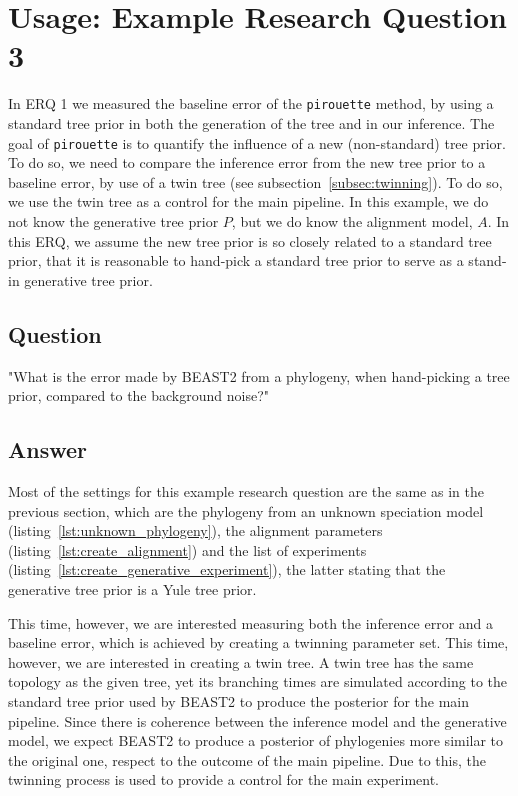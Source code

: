 \documentclass{article}
\begin{document}
\section{Usage: Example Research Question 3}

In ERQ 1 we measured the baseline error of the \verb;pirouette; method, 
by using a standard tree prior in both the generation of the tree 
and in our inference.
The goal of \verb;pirouette; is to quantify the 
influence of a new (non-standard) tree prior.
To do so, we need to compare the inference error 
from the new tree prior to a baseline error,
by use of a twin tree (see subsection~\ref{subsec:twinning}).
To do so, we use the twin tree as a control for the main pipeline.
In this example, we do not know the generative tree prior $\mathit{P}$,
but we do know the alignment model, $\mathit{A}$.
In this ERQ, we assume the new tree prior is so closely related to
a standard tree prior, that it is reasonable to hand-pick a standard tree prior 
to serve as a stand-in generative tree prior.

\subsection{Question}

"What is the error made by BEAST2 from a phylogeny, 
when hand-picking a tree prior, compared to the background noise?"

\subsection{Answer}

Most of the settings for this example research question are
the same as in the previous section, which are
the phylogeny from an unknown speciation model 
(listing~\ref{lst:unknown_phylogeny}), 
the alignment parameters (listing~\ref{lst:create_alignment})
and the list of experiments (listing~\ref{lst:create_generative_experiment}),
the latter stating that the generative tree prior is a Yule tree prior.

This time, however, we are interested measuring both the inference error
and a baseline error, which is achieved by creating a twinning parameter
set. 
This time, however, we are interested in creating a twin tree. A twin tree
has the same topology as the given tree, yet its branching times are simulated 
according to the standard tree prior used by BEAST2 to produce the posterior 
for the main pipeline. 
Since there is coherence between the inference model and the generative model, 
we expect BEAST2 to produce a posterior of phylogenies more similar to the 
original one, respect to the outcome of the main pipeline. 
Due to this, the twinning process is used to provide a control for the main 
experiment.
\end{document}
